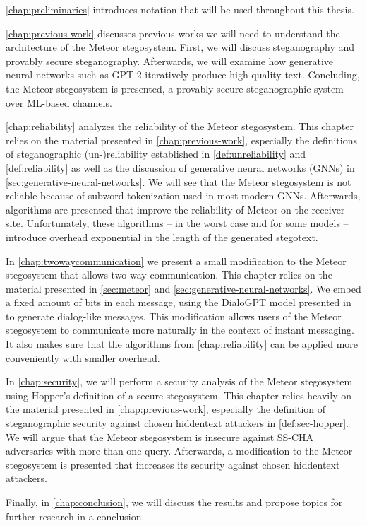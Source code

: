 \autoref{chap:preliminaries} introduces notation that will be used throughout this thesis.

\autoref{chap:previous-work} discusses previous works we will need to understand the architecture of the Meteor stegosystem.
First, we will discuss steganography and provably secure steganography.
Afterwards, we will examine how generative neural networks such as GPT-2 iteratively produce high-quality text.
Concluding, the Meteor stegosystem is presented, a provably secure steganographic system over ML-based channels.

\autoref{chap:reliability} analyzes the reliability of the Meteor stegosystem. 
This chapter relies on the material presented in \autoref{chap:previous-work}, especially the definitions of steganographic (un-)reliability established in \autoref{def:unreliability} and \autoref{def:reliability} as well as the discussion of generative neural networks (GNNs) in \autoref{sec:generative-neural-networks}.
We will see that the Meteor stegosystem is not reliable because of subword tokenization used in most modern GNNs.
Afterwards, algorithms are presented that improve the reliability of Meteor on the receiver site.
Unfortunately, these algorithms -- in the worst case and for some models -- introduce overhead exponential in the length of the generated stegotext.

In \autoref{chap:twowaycommunication} we present a small modification to the Meteor stegosystem that allows two-way communication.
This chapter relies on the material presented in \autoref{sec:meteor} and \autoref{sec:generative-neural-networks}.
We embed a fixed amount of bits in each message, using the DialoGPT model presented in \cite{Zhang2020} to generate dialog-like messages.
This modification allows users of the Meteor stegosystem to communicate more naturally in the context of instant messaging.
It also makes sure that the algorithms from \autoref{chap:reliability} can be applied more conveniently with smaller overhead.

In \autoref{chap:security}, we will perform a security analysis of the Meteor stegosystem using Hopper's definition of a secure stegosystem.
This chapter relies heavily on the material presented in \autoref{chap:previous-work}, especially the definition of steganographic security against chosen hiddentext attackers in \autoref{def:sec-hopper}.
We will argue that the Meteor stegosystem is insecure against SS-CHA adversaries with more than one query.
Afterwards, a modification to the Meteor stegosystem is presented that increases its security against chosen hiddentext attackers.

Finally, in \autoref{chap:conclusion}, we will discuss the results and propose topics for further research in a conclusion.
